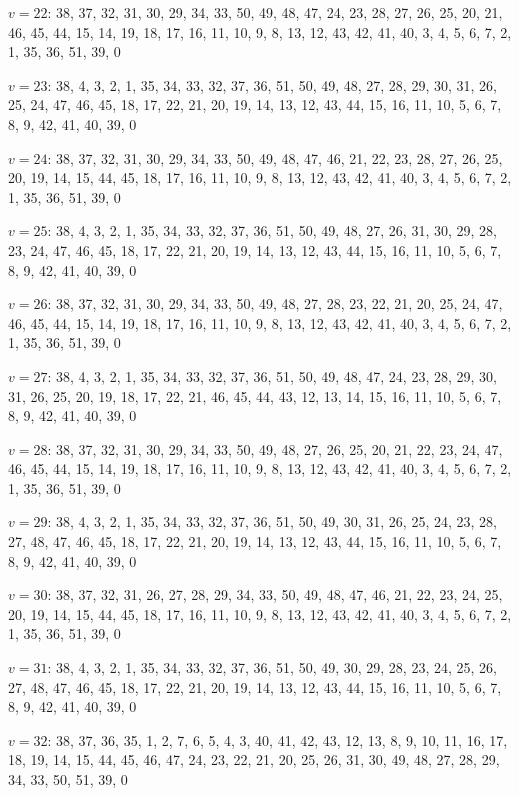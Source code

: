 \documentclass{amcjoucc}
\begin{document}
\begin{itemize}
{\item $v = 22$: 38, 37, 32, 31, 30, 29, 34, 33, 50, 49, 48, 47, 24, 23, 28, 27, 26, 25, 20, 21, 46, 45, 44, 15, 14, 19, 18, 17, 16, 11, 10, 9, 8, 13, 12, 43, 42, 41, 40, 3, 4, 5, 6, 7, 2, 1, 35, 36, 51, 39, 0
\item $v = 23$: 38, 4, 3, 2, 1, 35, 34, 33, 32, 37, 36, 51, 50, 49, 48, 27, 28, 29, 30, 31, 26, 25, 24, 47, 46, 45, 18, 17, 22, 21, 20, 19, 14, 13, 12, 43, 44, 15, 16, 11, 10, 5, 6, 7, 8, 9, 42, 41, 40, 39, 0
\item $v = 24$: 38, 37, 32, 31, 30, 29, 34, 33, 50, 49, 48, 47, 46, 21, 22, 23, 28, 27, 26, 25, 20, 19, 14, 15, 44, 45, 18, 17, 16, 11, 10, 9, 8, 13, 12, 43, 42, 41, 40, 3, 4, 5, 6, 7, 2, 1, 35, 36, 51, 39, 0
\item $v = 25$: 38, 4, 3, 2, 1, 35, 34, 33, 32, 37, 36, 51, 50, 49, 48, 27, 26, 31, 30, 29, 28, 23, 24, 47, 46, 45, 18, 17, 22, 21, 20, 19, 14, 13, 12, 43, 44, 15, 16, 11, 10, 5, 6, 7, 8, 9, 42, 41, 40, 39, 0
\item $v = 26$: 38, 37, 32, 31, 30, 29, 34, 33, 50, 49, 48, 27, 28, 23, 22, 21, 20, 25, 24, 47, 46, 45, 44, 15, 14, 19, 18, 17, 16, 11, 10, 9, 8, 13, 12, 43, 42, 41, 40, 3, 4, 5, 6, 7, 2, 1, 35, 36, 51, 39, 0
\item $v = 27$: 38, 4, 3, 2, 1, 35, 34, 33, 32, 37, 36, 51, 50, 49, 48, 47, 24, 23, 28, 29, 30, 31, 26, 25, 20, 19, 18, 17, 22, 21, 46, 45, 44, 43, 12, 13, 14, 15, 16, 11, 10, 5, 6, 7, 8, 9, 42, 41, 40, 39, 0
\item $v = 28$: 38, 37, 32, 31, 30, 29, 34, 33, 50, 49, 48, 27, 26, 25, 20, 21, 22, 23, 24, 47, 46, 45, 44, 15, 14, 19, 18, 17, 16, 11, 10, 9, 8, 13, 12, 43, 42, 41, 40, 3, 4, 5, 6, 7, 2, 1, 35, 36, 51, 39, 0
\item $v = 29$: 38, 4, 3, 2, 1, 35, 34, 33, 32, 37, 36, 51, 50, 49, 30, 31, 26, 25, 24, 23, 28, 27, 48, 47, 46, 45, 18, 17, 22, 21, 20, 19, 14, 13, 12, 43, 44, 15, 16, 11, 10, 5, 6, 7, 8, 9, 42, 41, 40, 39, 0
\item $v = 30$: 38, 37, 32, 31, 26, 27, 28, 29, 34, 33, 50, 49, 48, 47, 46, 21, 22, 23, 24, 25, 20, 19, 14, 15, 44, 45, 18, 17, 16, 11, 10, 9, 8, 13, 12, 43, 42, 41, 40, 3, 4, 5, 6, 7, 2, 1, 35, 36, 51, 39, 0
\item $v = 31$: 38, 4, 3, 2, 1, 35, 34, 33, 32, 37, 36, 51, 50, 49, 30, 29, 28, 23, 24, 25, 26, 27, 48, 47, 46, 45, 18, 17, 22, 21, 20, 19, 14, 13, 12, 43, 44, 15, 16, 11, 10, 5, 6, 7, 8, 9, 42, 41, 40, 39, 0
\item $v = 32$: 38, 37, 36, 35, 1, 2, 7, 6, 5, 4, 3, 40, 41, 42, 43, 12, 13, 8, 9, 10, 11, 16, 17, 18, 19, 14, 15, 44, 45, 46, 47, 24, 23, 22, 21, 20, 25, 26, 31, 30, 49, 48, 27, 28, 29, 34, 33, 50, 51, 39, 0
}
\end{itemize}
\end{document}
